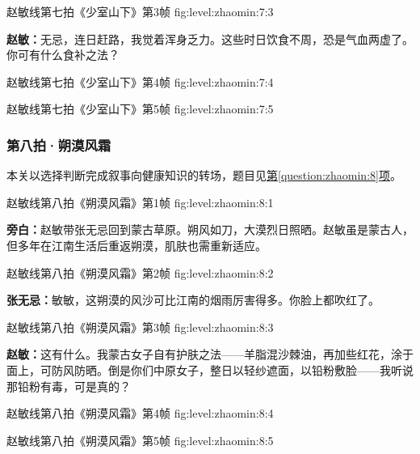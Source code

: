   {赵敏线第七拍《少室山下》第3帧}
  {fig:level:zhaomin:7:3}
  {\scriptsize}
  {\textbf{赵敏：}无忌，连日赶路，我觉着浑身乏力。这些时日饮食不周，恐是气血两虚了。你可有什么食补之法？\par}

\clearpage

  {赵敏线第七拍《少室山下》第4帧}
  {fig:level:zhaomin:7:4}
  {\scriptsize}
  {\mbox{}}

  {赵敏线第七拍《少室山下》第5帧}
  {fig:level:zhaomin:7:5}
  {\scriptsize}
  {\mbox{}}

\subsubsection{第八拍·朔漠风霜}\label{plot:zhaomin:8}
本关以选择判断完成叙事向健康知识的转场，题目见\hyperref[question:zhaomin:8]{第\ref*{question:zhaomin:8}项}。

  {赵敏线第八拍《朔漠风霜》第1帧}
  {fig:level:zhaomin:8:1}
  {\scriptsize}
  {\textbf{旁白：}赵敏带张无忌回到蒙古草原。朔风如刀，大漠烈日照晒。赵敏虽是蒙古人，但多年在江南生活后重返朔漠，肌肤也需重新适应。\par}

\clearpage

  {赵敏线第八拍《朔漠风霜》第2帧}
  {fig:level:zhaomin:8:2}
  {\scriptsize}
  {\textbf{张无忌：}敏敏，这朔漠的风沙可比江南的烟雨厉害得多。你脸上都吹红了。\par}

  {赵敏线第八拍《朔漠风霜》第3帧}
  {fig:level:zhaomin:8:3}
  {\scriptsize}
  {\textbf{赵敏：}这有什么。我蒙古女子自有护肤之法——羊脂混沙棘油，再加些红花，涂于面上，可防风防晒。倒是你们中原女子，整日以轻纱遮面，以铅粉敷脸——我听说那铅粉有毒，可是真的？\par}

  {赵敏线第八拍《朔漠风霜》第4帧}
  {fig:level:zhaomin:8:4}
  {\scriptsize}
  {\mbox{}}

\clearpage

  {赵敏线第八拍《朔漠风霜》第5帧}
  {fig:level:zhaomin:8:5}
  {\scriptsize}
  {\mbox{}}

